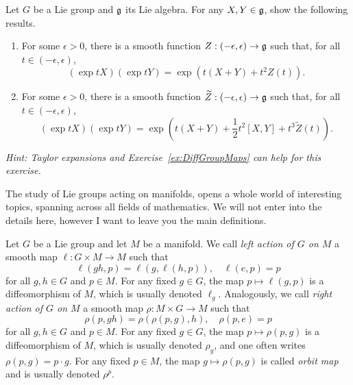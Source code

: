 \begin{exercise}
	Let $G$ be a Lie group and $\mathfrak{g}$ its Lie algebra.
	For any $X,Y\in\mathfrak{g}$, show the following results.
	\begin{enumerate}
		\item For some $\epsilon>0$, there is a smooth function $Z:(-\epsilon, \epsilon)\to \mathfrak{g}$  such that, for all $t\in(-\epsilon, \epsilon)$,
		      \begin{equation}
			      (\exp tX)(\exp tY) = \exp(t (X+Y) + t^2 Z(t)).
		      \end{equation}
		\item For some $\epsilon>0$, there is a smooth function $\widetilde Z:(-\epsilon, \epsilon)\to \mathfrak{g}$ such that, for all $t\in(-\epsilon, \epsilon)$,
		      \begin{equation}
			      (\exp tX)(\exp tY) = \exp\left(t (X+Y) + \frac12 t^2 [X,Y] + t^3 \widetilde Z(t)\right).
		      \end{equation}
	\end{enumerate}
	\textit{\small Hint: Taylor expansions and Exercise~\ref{ex:DiffGroupMaps} can help for this exercise.}
\end{exercise}

The study of Lie groups acting on manifolds, opens a whole world of interesting topics, spanning across all fields of mathematics.
We will not enter into the details here, however I want to leave you the main definitions.

\begin{definition}
	Let $G$ be a Lie group and let $M$ be a manifold.
	We call \emph{left action of $G$ on $M$} a smooth map $\ell: G\times M \to M$ such that
	\begin{equation}
		\ell(gh, p) = \ell(g,\ell(h,p)), \quad \ell(e, p) = p
	\end{equation}
	for all $g,h\in G$ and $p\in M$.
	For any fixed $g\in G$, the map $p\mapsto \ell(g,p)$ is a diffeomorphism of $M$, which is usually denoted $\ell_g$.
	Analogously, we call \emph{right action of $G$ on $M$} a smooth map $\rho: M\times G \to M$ such that
	\begin{equation}
		\rho(p, gh) = \rho(\rho(p,g), h), \quad \rho(p, e) = p
	\end{equation}
	for all $g,h\in G$ and $p\in M$.
	For any fixed $g\in G$, the map $p\mapsto \rho(p,g)$ is a diffeomorphism of $M$, which is usually denoted $\rho_g$, and one often writes $\rho(p,g) = p\cdot g$.
	For any fixed $p\in M$, the map $g\mapsto \rho(p,g)$ is called \emph{orbit map} and is usually denoted $\rho^p$.
\end{definition}

